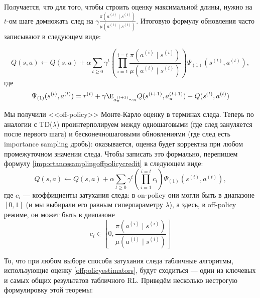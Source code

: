 Получается, что для того, чтобы строить оценку максимальной длины, нужно на $t$-ом шаге домножать след на
$\gamma \frac{\pi(a^{(t)} \mid s^{(t)})}{\mu(a^{(t)} \mid s^{(t)})}$. Итоговую формулу обновления часто записывают в следующем виде:

\begin{equation}\label{importancesamplingoffpolicycredit}
Q(s, a) \leftarrow Q(s, a) + \alpha 
\sum_{t \ge 0} \gamma^t  \left( \prod_{i = 1}^{i = t} \frac{\pi(a^{(i)} \mid s^{(i)}) }{\mu(a^{(i)} \mid s^{(i)})} \right) \Psi_{(1)}(s^{(t)}, a^{(t)}),
\end{equation}
где
\begin{equation}\label{onestepoffpolicyQdelta}
\Psi_{(1)}(s^{(t)}, a^{(t)}) = r^{(t)} + \gamma \E_{a^{(t+1)}_\pi \sim \pi} Q(s^{(t+1)}, a^{(t+1)}_\pi) - Q(s^{(t)}, a^{(t)})    
\end{equation}


Мы получили <<off-policy>> Монте-Карло оценку в терминах следа. Теперь по аналогии с TD($\lambda$) проинтерполируем между одношаговыми (где след зануляется после первого шага) и бесконечношаговыми обновлениями (где след есть importance sampling дробь): оказывается, оценка будет корректна при любом промежуточном значении следа. Чтобы записать это формально, перепишем формулу \eqref{importancesamplingoffpolicycredit} в следующем виде:
\begin{equation}\label{offpolicyestimators}
Q(s, a) \leftarrow Q(s, a) + \alpha 
\sum_{t \ge 0} \gamma^t  \left( \prod_{i = 1}^{i = t}  c_{i} \right) \Psi_{(1)}(s^{(t)}, a^{(t)}),
\end{equation}
где $c_i$ --- коэффициенты затухания следа: в on-policy они могли быть в диапазоне $[0, 1]$ (и мы выбирали его равным гиперпараметру $\lambda$), а здесь, в off-policy режиме, он может быть в диапазоне
$$c_i \in \left[ 0, \frac{\pi(a^{(i)} \mid s^{(i)}) }{\mu(a^{(i)} \mid s^{(i)})} \right]$$

То, что при любом выборе способа затухания следа табличные алгоритмы, использующие оценку \eqref{offpolicyestimators}, будут сходиться --- один из ключевых и самых общих результатов табличного RL. Приведём несколько нестрогую формулировку этой теоремы:

